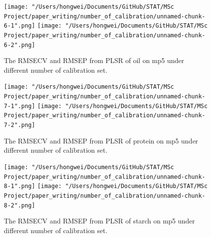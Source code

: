 \documentclass[a4paper,12pt,titlepage]{article} %
\numberwithin{equation}{section}  %
\begin{document}
\begin{appendices}
			\begin{figure}[h]    %
	\centering           %
	\texttt{[image: "/Users/hongwei/Documents/GitHub/STAT/MSc Project/paper\_writing/number\_of\_calibration/unnamed-chunk-6-1".png]}  %
	\texttt{[image: "/Users/hongwei/Documents/GitHub/STAT/MSc Project/paper\_writing/number\_of\_calibration/unnamed-chunk-6-2".png]}  %
	\caption{The RMSECV and RMSEP from PLSR of oil on mp5 under different number of calibration set.}          %
	\label{fig:calibration_6-1}               %
\end{figure}                        %



			\begin{figure}[h]    %
	\centering           %
	\texttt{[image: "/Users/hongwei/Documents/GitHub/STAT/MSc Project/paper\_writing/number\_of\_calibration/unnamed-chunk-7-1".png]}  %
	\texttt{[image: "/Users/hongwei/Documents/GitHub/STAT/MSc Project/paper\_writing/number\_of\_calibration/unnamed-chunk-7-2".png]}  %
	\caption{The RMSECV and RMSEP from PLSR of protein on mp5 under different number of calibration set.}          %
	\label{fig:calibration_7-1}               %
\end{figure}                        %



			\begin{figure}[h]    %
	\centering           %
	\texttt{[image: "/Users/hongwei/Documents/GitHub/STAT/MSc Project/paper\_writing/number\_of\_calibration/unnamed-chunk-8-1".png]}  %
	\texttt{[image: "/Users/hongwei/Documents/GitHub/STAT/MSc Project/paper\_writing/number\_of\_calibration/unnamed-chunk-8-2".png]}  %
	\caption{The RMSECV and RMSEP from PLSR of starch on mp5 under different number of calibration set.}          %
	\label{fig:calibration_8-1}               %
\end{figure}                        %




\end{appendices}
\end{document}

